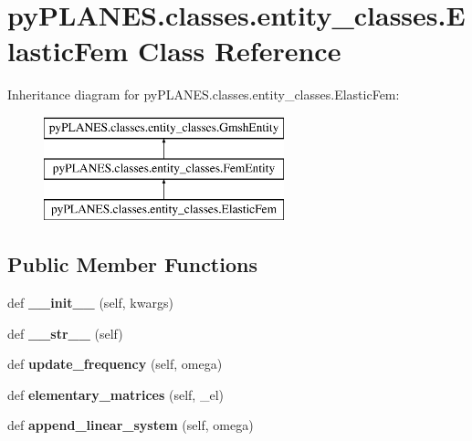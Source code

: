 \hypertarget{classpy_p_l_a_n_e_s_1_1classes_1_1entity__classes_1_1_elastic_fem}{}\section{py\+P\+L\+A\+N\+E\+S.\+classes.\+entity\+\_\+classes.\+Elastic\+Fem Class Reference}
\label{classpy_p_l_a_n_e_s_1_1classes_1_1entity__classes_1_1_elastic_fem}
Inheritance diagram for py\+P\+L\+A\+N\+E\+S.\+classes.\+entity\+\_\+classes.\+Elastic\+Fem\+:\begin{figure}[H]
\begin{center}
\leavevmode
\includegraphics[height=3.000000cm]{classpy_p_l_a_n_e_s_1_1classes_1_1entity__classes_1_1_elastic_fem}
\end{center}
\end{figure}
\subsection*{Public Member Functions}
\begin{DoxyCompactItemize}
\item 
\mbox{\label{classpy_p_l_a_n_e_s_1_1classes_1_1entity__classes_1_1_elastic_fem_a4cb7e815035fed9eccaf5cecc2d53933}} 
def {\bfseries \+\_\+\+\_\+init\+\_\+\+\_\+} (self, kwargs)
\item 
\mbox{\label{classpy_p_l_a_n_e_s_1_1classes_1_1entity__classes_1_1_elastic_fem_a30482821d48e9c80549d0cfa0a4158d8}} 
def {\bfseries \+\_\+\+\_\+str\+\_\+\+\_\+} (self)
\item 
\mbox{\label{classpy_p_l_a_n_e_s_1_1classes_1_1entity__classes_1_1_elastic_fem_aa45ec0d99df75ecfeadaa1d43a9d231d}} 
def {\bfseries update\+\_\+frequency} (self, omega)
\item 
\mbox{\label{classpy_p_l_a_n_e_s_1_1classes_1_1entity__classes_1_1_elastic_fem_aabcf6cb460abbc21b17423562ce91530}} 
def {\bfseries elementary\+\_\+matrices} (self, \+\_\+el)
\item 
\mbox{\label{classpy_p_l_a_n_e_s_1_1classes_1_1entity__classes_1_1_elastic_fem_a24e1a6c806d8d5f5e38dbec96249d226}} 
def {\bfseries append\+\_\+linear\+\_\+system} (self, omega)
\end{DoxyCompactItemize}
